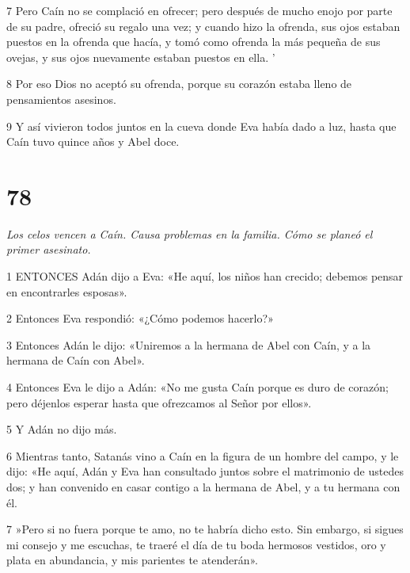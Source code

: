 \par 7 Pero Caín no se complació en ofrecer; pero después de mucho enojo por parte de su padre, ofreció su regalo una vez; y cuando hizo la ofrenda, sus ojos estaban puestos en la ofrenda que hacía, y tomó como ofrenda la más pequeña de sus ovejas, y sus ojos nuevamente estaban puestos en ella. '

\par 8 Por eso Dios no aceptó su ofrenda, porque su corazón estaba lleno de pensamientos asesinos.

\par 9 Y así vivieron todos juntos en la cueva donde Eva había dado a luz, hasta que Caín tuvo quince años y Abel doce.

\chapter{78}

\par \textit{Los celos vencen a Caín. Causa problemas en la familia. Cómo se planeó el primer asesinato.}

\par 1 ENTONCES Adán dijo a Eva: «He aquí, los niños han crecido; debemos pensar en encontrarles esposas».

\par 2 Entonces Eva respondió: «¿Cómo podemos hacerlo?»

\par 3 Entonces Adán le dijo: «Uniremos a la hermana de Abel con Caín, y a la hermana de Caín con Abel».

\par 4 Entonces Eva le dijo a Adán: «No me gusta Caín porque es duro de corazón; pero déjenlos esperar hasta que ofrezcamos al Señor por ellos».

\par 5 Y Adán no dijo más.

\par 6 Mientras tanto, Satanás vino a Caín en la figura de un hombre del campo, y le dijo: «He aquí, Adán y Eva han consultado juntos sobre el matrimonio de ustedes dos; y han convenido en casar contigo a la hermana de Abel, y a tu hermana con él.

\par 7 »Pero si no fuera porque te amo, no te habría dicho esto. Sin embargo, si sigues mi consejo y me escuchas, te traeré el día de tu boda hermosos vestidos, oro y plata en abundancia, y mis parientes te atenderán».

